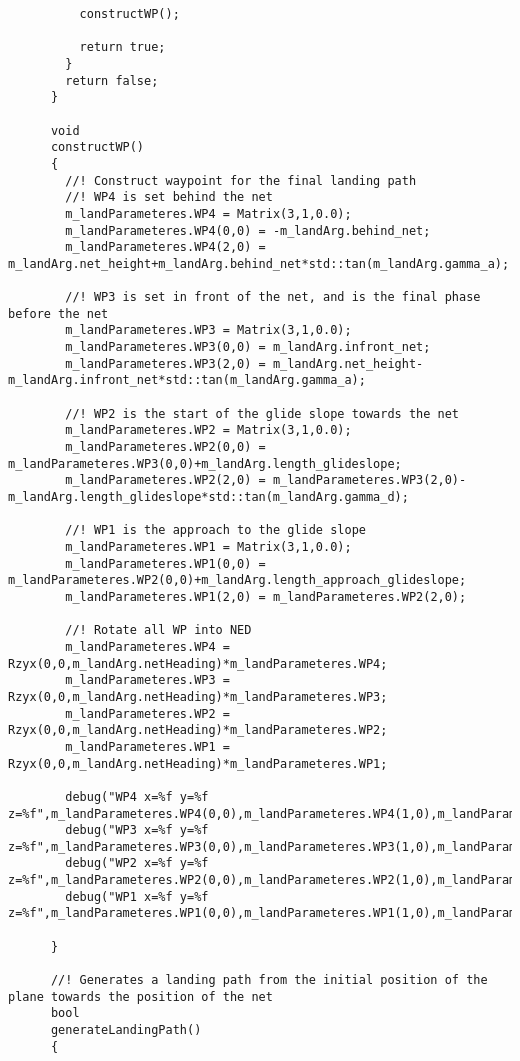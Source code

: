 \begin{frame}[fragile]
\begin{lstlisting}
          constructWP();

          return true;
        }
        return false;
      }

      void
      constructWP()
      {
        //! Construct waypoint for the final landing path
        //! WP4 is set behind the net
        m_landParameteres.WP4 = Matrix(3,1,0.0);
        m_landParameteres.WP4(0,0) = -m_landArg.behind_net;
        m_landParameteres.WP4(2,0) = m_landArg.net_height+m_landArg.behind_net*std::tan(m_landArg.gamma_a);

        //! WP3 is set in front of the net, and is the final phase before the net
        m_landParameteres.WP3 = Matrix(3,1,0.0);
        m_landParameteres.WP3(0,0) = m_landArg.infront_net;
        m_landParameteres.WP3(2,0) = m_landArg.net_height-m_landArg.infront_net*std::tan(m_landArg.gamma_a);

        //! WP2 is the start of the glide slope towards the net
        m_landParameteres.WP2 = Matrix(3,1,0.0);
        m_landParameteres.WP2(0,0) = m_landParameteres.WP3(0,0)+m_landArg.length_glideslope;
        m_landParameteres.WP2(2,0) = m_landParameteres.WP3(2,0)-m_landArg.length_glideslope*std::tan(m_landArg.gamma_d);

        //! WP1 is the approach to the glide slope
        m_landParameteres.WP1 = Matrix(3,1,0.0);
        m_landParameteres.WP1(0,0) = m_landParameteres.WP2(0,0)+m_landArg.length_approach_glideslope;
        m_landParameteres.WP1(2,0) = m_landParameteres.WP2(2,0);

        //! Rotate all WP into NED
        m_landParameteres.WP4 = Rzyx(0,0,m_landArg.netHeading)*m_landParameteres.WP4;
        m_landParameteres.WP3 = Rzyx(0,0,m_landArg.netHeading)*m_landParameteres.WP3;
        m_landParameteres.WP2 = Rzyx(0,0,m_landArg.netHeading)*m_landParameteres.WP2;
        m_landParameteres.WP1 = Rzyx(0,0,m_landArg.netHeading)*m_landParameteres.WP1;

        debug("WP4 x=%f y=%f z=%f",m_landParameteres.WP4(0,0),m_landParameteres.WP4(1,0),m_landParameteres.WP4(2,0));
        debug("WP3 x=%f y=%f z=%f",m_landParameteres.WP3(0,0),m_landParameteres.WP3(1,0),m_landParameteres.WP3(2,0));
        debug("WP2 x=%f y=%f z=%f",m_landParameteres.WP2(0,0),m_landParameteres.WP2(1,0),m_landParameteres.WP2(2,0));
        debug("WP1 x=%f y=%f z=%f",m_landParameteres.WP1(0,0),m_landParameteres.WP1(1,0),m_landParameteres.WP1(2,0));

      }

      //! Generates a landing path from the initial position of the plane towards the position of the net
      bool
      generateLandingPath()
      {


\end{lstlisting}
\end{frame}
